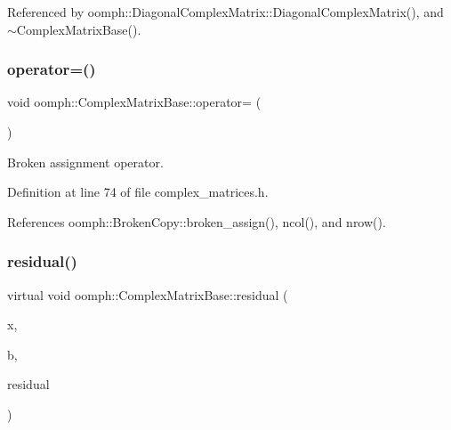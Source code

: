 Referenced by oomph\+::\+Diagonal\+Complex\+Matrix\+::\+Diagonal\+Complex\+Matrix(), and $\sim$\+Complex\+Matrix\+Base().

\mbox{\label{classoomph_1_1ComplexMatrixBase_aa1c04df6907d8f8b6517ede080b86705}} 
\subsubsection{\texorpdfstring{operator=()}{operator=()}}
{\footnotesize\ttfamily void oomph\+::\+Complex\+Matrix\+Base\+::operator= (\begin{DoxyParamCaption}\item[{const \hyperlink{classoomph_1_1ComplexMatrixBase}{Complex\+Matrix\+Base} \&}]{ }\end{DoxyParamCaption})\hspace{0.3cm}{\ttfamily [inline]}}



Broken assignment operator. 



Definition at line 74 of file complex\+\_\+matrices.\+h.



References oomph\+::\+Broken\+Copy\+::broken\+\_\+assign(), ncol(), and nrow().

\mbox{\label{classoomph_1_1ComplexMatrixBase_aec72875402b9ba387e0724d6c2597430}} 
\subsubsection{\texorpdfstring{residual()}{residual()}}
{\footnotesize\ttfamily virtual void oomph\+::\+Complex\+Matrix\+Base\+::residual (\begin{DoxyParamCaption}\item[{const \hyperlink{classoomph_1_1Vector}{Vector}$<$ std\+::complex$<$ double $>$ $>$ \&}]{x,  }\item[{const \hyperlink{classoomph_1_1Vector}{Vector}$<$ std\+::complex$<$ double $>$ $>$ \&}]{b,  }\item[{\hyperlink{classoomph_1_1Vector}{Vector}$<$ std\+::complex$<$ double $>$ $>$ \&}]{residual }\end{DoxyParamCaption})\hspace{0.3cm}{\ttfamily [pure virtual]}}




